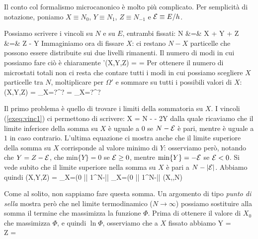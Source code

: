 Il conto col formalismo microcanonico è molto più complicato. Per semplicità di notazione, poniamo $X \equiv N_{0}$, $Y \equiv N_{1}$, $Z \equiv N_{-1}$ e ${\mathcal E} \equiv E/h$.

Possiamo scrivere i vincoli su $N$ e su $E$, entrambi fissati:
\bea
\label{exeq:vinc1}
N &=& X + Y + Z \nonumber \\
\calE &=& Z - Y
\eea
Immaginiamo ora di fissare $X$: ci restano $N-X$ particelle che possono essere distribuite sui due livelli rimanenti. Il numero di modi in cui possiamo fare ciò è chiaramente
\be
\Omega'(X,Y,Z) =  = 
\ee
Per ottenere il numero di microstati totali non ci resta che contare tutti i modi in cui possiamo scegliere $X$ particelle tra $N$, moltiplicare per $\Omega'$ e sommare su tutti i possibili valori di $X$:
\be
\Omega(X,Y,Z) = \sum_{X=?}^{?}  =
\sum_{X=?}^{?} 
\ee

Il primo problema è quello di trovare i limiti della sommatoria su $X$. I vincoli (\ref{exeq:vinc1}) ci permettono di scrivere:
\be
X = N - \calE - 2Y
\ee
dalla quale ricaviamo che il limite inferiore della somma su $X$ è uguale a $0$ se $N-{\mathcal E}$ è pari, mentre è uguale a $1$ in caso contrario. L'ultima equazione ci mostra anche che il limite superiore della somma su $X$ corrisponde al valore minimo di $Y$: osserviamo però, notando che $Y = Z-{\mathcal E}$, che $\text{min}\{Y\} = 0$ se ${\mathcal E} \ge 0$, mentre $\text{min}\{Y\} = -{\mathcal E}$ se ${\mathcal E} < 0$. Si vede subito che il limite superiore nella somma su $X$ è pari a $N-|{\mathcal E}|$. Abbiamo quindi
\be
\Omega(X,Y,Z) = \sum_{X=(0 || 1}^{N-|\calE|}  \equiv \sum_{X=(0 || 1}^{N-|\calE|}
\Phi(X,\calE,N)
\ee

Come al solito, non sappiamo fare questa somma. Un argomento di tipo {\em punto di sella} mostra però che nel limite termodinamico ($N\to\infty$) possiamo sostituire alla somma il termine che massimizza la funzione $\Phi$. Prima di ottenere il valore di $X_0$ che massimizza $\Phi$, e quindi $\ln\Phi$, osserviamo che a $X$ fissato abbiamo
\bea
\label{exeq:YZ}
Y =  \nonumber \\
Z = 
\eea


